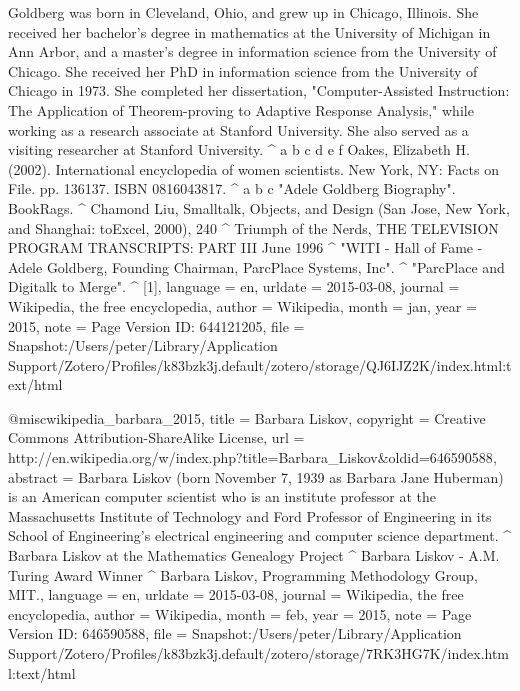 {{{Goldberg was born in Cleveland, Ohio, and grew up in Chicago, Illinois. She received her bachelor's degree in mathematics at the University of Michigan in Ann Arbor, and a master's degree in information science from the University of Chicago. She received her PhD in information science from the University of Chicago in 1973. She completed her dissertation, "Computer-Assisted Instruction: The Application of Theorem-proving to Adaptive Response Analysis," while working as a research associate at Stanford University. She also served as a visiting researcher at Stanford University.
{\textasciicircum} a b c d e f Oakes, Elizabeth H. (2002). International encyclopedia of women scientists. New York, NY: Facts on File. pp. 136{\textendash}137. ISBN 0816043817. 
{\textasciicircum} a b c "Adele Goldberg Biography". BookRags. 
{\textasciicircum} Chamond Liu, Smalltalk, Objects, and Design (San Jose, New York, and Shanghai: toExcel, 2000), 240
{\textasciicircum} Triumph of the Nerds, THE TELEVISION PROGRAM TRANSCRIPTS: PART III June 1996
{\textasciicircum} "WITI - Hall of Fame - Adele Goldberg, Founding Chairman, ParcPlace Systems, Inc". 
{\textasciicircum} "ParcPlace and Digitalk to Merge". 
{\textasciicircum} [1]},
  language  = {en},
  urldate   = {2015-03-08},
  journal   = {Wikipedia, the free encyclopedia},
  author    = {{Wikipedia}},
  month     = jan,
  year      = {2015},
  note      = {Page Version ID: 644121205},
  file      = {Snapshot:/Users/peter/Library/Application Support/Zotero/Profiles/k83bzk3j.default/zotero/storage/QJ6IJZ2K/index.html:text/html}
}

@misc{wikipedia_barbara_2015,
  title     = {Barbara {Liskov}},
  copyright = {Creative Commons Attribution-ShareAlike License},
  url       = {http://en.wikipedia.org/w/index.php?title=Barbara_Liskov&oldid=646590588},
  abstract  = {Barbara Liskov (born November 7, 1939 as Barbara Jane Huberman) is an American computer scientist who is an institute professor at the Massachusetts Institute of Technology and Ford Professor of Engineering in its School of Engineering's electrical engineering and computer science department.
{\textasciicircum} Barbara Liskov at the Mathematics Genealogy Project
{\textasciicircum} Barbara Liskov - A.M. Turing Award Winner
{\textasciicircum} Barbara Liskov, Programming Methodology Group, MIT.},
  language  = {en},
  urldate   = {2015-03-08},
  journal   = {Wikipedia, the free encyclopedia},
  author    = {{Wikipedia}},
  month     = feb,
  year      = {2015},
  note      = {Page Version ID: 646590588},
  file      = {Snapshot:/Users/peter/Library/Application Support/Zotero/Profiles/k83bzk3j.default/zotero/storage/7RK3HG7K/index.html:text/html}
}

}
